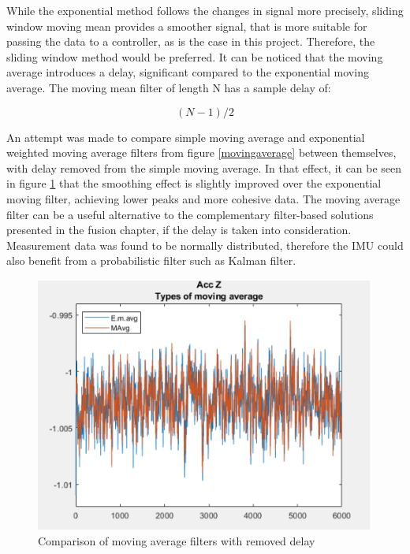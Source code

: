 While the exponential method follows the changes in signal more precisely, sliding window moving mean provides a smoother signal, that is more suitable for passing the data to a controller, as is the case in this project. Therefore, the sliding window method would be preferred. 
It can be noticed that the moving average introduces a delay, significant compared to the exponential moving average. The moving mean filter of length N has a sample delay of:

\begin{equation}\label{delay}
	(N-1)/2
\end{equation}

An attempt was made to compare simple moving average and exponential weighted moving average filters from figure \ref{movingaverage} between themselves, with delay removed from the simple moving average. In that effect, it can be seen in figure \ref{movingaveragenodelay} that the smoothing effect is slightly improved over the exponential moving filter, achieving lower peaks and more cohesive data. The moving average filter can be a useful alternative to the complementary filter-based solutions presented in the fusion chapter, if the delay is taken into consideration. Measurement data was found to be normally distributed, therefore the IMU could also benefit from a probabilistic filter such as Kalman filter. 

\begin{figure}[H]
  \centering
  \includegraphics[scale=0.9]{graphics/accznodelay.png}
  \caption{Comparison of moving average filters with removed delay}
  \label{movingaveragenodelay}
\end{figure}

